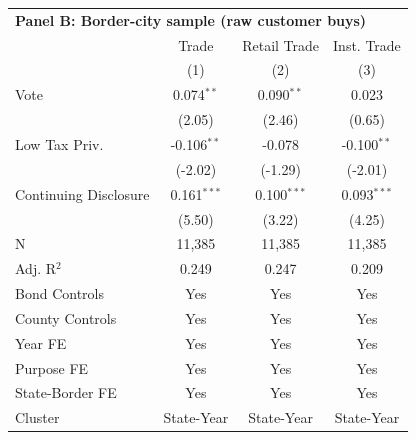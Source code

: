 \begingroup
\centering
\begin{tabular*}{\textwidth}{@{\extracolsep{\fill}}lccc}
\multicolumn{5}{l}{\textbf{Panel B: Border-city sample (raw customer buys)}}\\

\addlinespace
   \toprule
                         & Trade         & Retail Trade  & Inst. Trade\\  
                         & (1)           & (2)           & (3)\\  
   \midrule 
   Vote                  & 0.074$^{**}$  & 0.090$^{**}$  & 0.023\\   
                         & (2.05)       & (2.46)       & (0.65)\\   
   Low Tax Priv.         & -0.106$^{**}$ & -0.078        & -0.100$^{**}$\\   
                         & (-2.02)      & (-1.29)      & (-2.01)\\   
   Continuing Disclosure & 0.161$^{***}$ & 0.100$^{***}$ & 0.093$^{***}$\\   
                         & (5.50)       & (3.22)       & (4.25)\\   
   \hline
   N          & 11,385        & 11,385        & 11,385\\  
   Adj. R$^2$        & 0.249         & 0.247         & 0.209\\  
   Bond Controls         & Yes           & Yes           & Yes\\  
   County Controls       & Yes           & Yes           & Yes\\  
   Year FE               & Yes           & Yes           & Yes\\  
   Purpose FE            & Yes           & Yes           & Yes\\  
   State-Border FE       & Yes           & Yes           & Yes\\  
   Cluster              & State-Year & State-Year & State-Year\\  
   \bottomrule
\end{tabular*}
\par\endgroup
